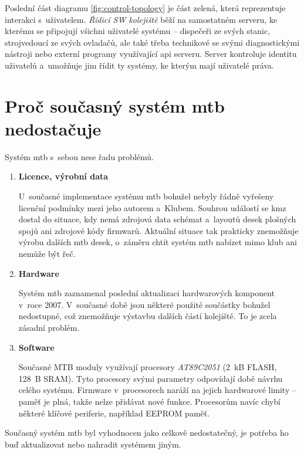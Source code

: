Poslední část diagramu \ref{fig:control-topology} je část zelená, která
reprezentuje interakci s~uživatelem. \textit{Řídicí SW kolejiště} běží na
samostatném serveru, ke kterému se připojují všichni uživatelé systému –
dispečeři ze svých stanic, strojvedoucí ze svých ovladačů, ale také třeba
technikové se svými diagnostickými nástroji nebo externí programy využívající
\gls{api} serveru. Server kontroluje identitu uživatelů a~umožňuje jim řídit ty
systémy, ke kterým mají uživatelé práva.

\section{Proč současný systém \gls{mtb} nedostačuje} \label{sec:mtb_fail}

Systém \gls{mtb} s~sebou nese řadu problémů.

\begin{enumerate}
\item \textbf{Licence, výrobní data}

U~současné implementace systému \gls{mtb} bohužel nebyly řádně vyřešeny licenční
podmínky mezi jeho autorem a~Klubem. Souhrou událostí se \gls{kmz} dostal do
situace, kdy nemá zdrojová data schémat a~layoutů desek plošných spojů ani
zdrojové kódy firmwarů.
Aktuální situace tak prakticky znemožňuje výrobu dalších \gls{mtb} desek,
o~záměru chtít systém \gls{mtb} nabízet mimo klub ani nemůže být řeč.

\item \textbf{Hardware}

Systém \gls{mtb} zaznamenal poslední aktualizaci hardwarových komponent v~roce
2007. V~současné době jsou některé použité součástky bohužel nedostupné, což
znemožňuje výstavbu dalších částí kolejiště. To je zcela zásadní problém.

\item \textbf{Software}

Současné MTB moduly využívají procesory \textit{AT89C2051} (2~kB FLASH,
128~B SRAM). Tyto procesory svými parametry odpovídají době návrhu celého
systému. Firmware v~procesorech naráží na jejich hardwarové limity – paměť
je plná, takže nelze přidávat nové funkce. Procesorům navíc chybí některé
klíčové periferie, například EEPROM paměť.

\end{enumerate}

Současný systém \gls{mtb} byl vyhodnocen jako celkově nedostatečný, je potřeba
ho buď aktualizovat nebo nahradit systémem jiným.

